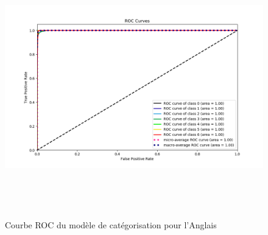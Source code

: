     \begin{figure}[H]
        \centering
        \includegraphics[height=320pt,width=330pt]{img/chapter4/result/rocEN.png}
        \caption{Courbe ROC du modèle de catégorisation pour l'Anglais}
        \label{roc-en}
    \end{figure}

